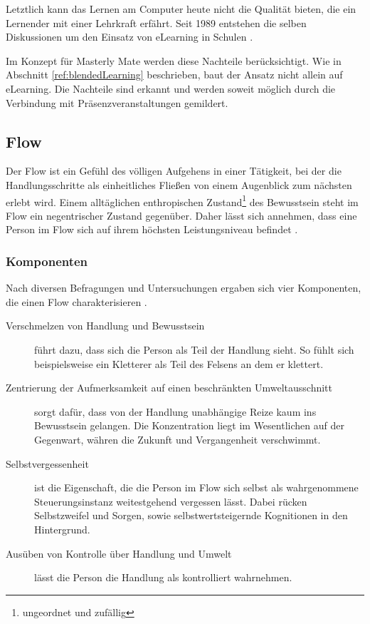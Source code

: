Letztlich kann das Lernen am Computer heute nicht die Qualität bieten, die ein
Lernender mit einer Lehrkraft erfährt. Seit 1989 entstehen die selben
Diskussionen um den Einsatz von eLearning in Schulen \cite{thome:1989}.

Im Konzept für Masterly Mate werden diese Nachteile berücksichtigt. Wie in
Abschnitt \ref{ref:blendedLearning} beschrieben, baut der Ansatz nicht allein
auf eLearning. Die Nachteile sind erkannt und werden soweit möglich durch die
Verbindung mit Präsenzveranstaltungen gemildert.

\subsection{Flow}\label{ref:basFlow}
Der Flow ist ein Gefühl des völligen Aufgehens in einer Tätigkeit, bei der
die Handlungsschritte als einheitliches Fließen von einem Augenblick zum
nächsten erlebt wird. Einem alltäglichen enthropischen
Zustand\footnote{ungeordnet und zufällig} des Bewusstsein steht im Flow ein
negentrischer Zustand gegenüber. Daher lässt sich annehmen, dass eine Person im
Flow sich auf ihrem höchsten Leistungsniveau befindet
\cite{csikszentmihalyi:1993}.
 
\subsubsection{Komponenten}
Nach diversen Befragungen und Untersuchungen ergaben
sich vier Komponenten, die einen Flow charakterisieren
\cite{csikszentmihalyi:1993}.
\begin{description}
\item[Verschmelzen von Handlung und Bewusstsein] führt dazu, dass sich die
Person als Teil der Handlung sieht. So fühlt sich beispielsweise ein Kletterer
als Teil des Felsens an dem er klettert.
\item[Zentrierung der Aufmerksamkeit auf einen beschränkten Umweltausschnitt]
sorgt dafür, dass von der Handlung unabhängige Reize kaum ins Bewusstsein
gelangen. Die Konzentration liegt im Wesentlichen auf der Gegenwart, währen die
Zukunft und Vergangenheit verschwimmt.
\item[Selbstvergessenheit] ist die Eigenschaft, die die Person im Flow sich
selbst als wahrgenommene Steuerungsinstanz weitestgehend vergessen lässt. Dabei
rücken Selbstzweifel und Sorgen, sowie selbstwertsteigernde Kognitionen in den
Hintergrund.
\item[Ausüben von Kontrolle über Handlung und Umwelt] lässt die Person die
Handlung als kontrolliert wahrnehmen.
\end{description}

